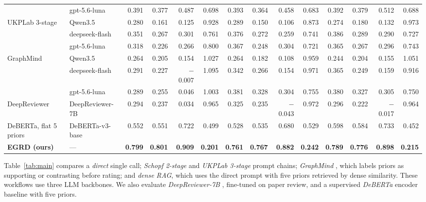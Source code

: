 \begin{table}[t]
{\begin{tabular}{@{}ll rrrr rrrr rrrr@{}}
& gpt-5.6-luna
& 0.391 & 0.377 & 0.487 & 0.698
& 0.393 & 0.364 & 0.458 & 0.683
& 0.392 & 0.379 & 0.512 & 0.688 \\
\addlinespace
UKPLab 3-stage & Qwen3.5
& 0.280 & 0.161 & 0.125 & 0.928
& 0.289 & 0.150 & 0.106 & 0.873
& 0.274 & 0.180 & 0.132 & 0.973 \\
& deepseek-flash
& 0.351 & 0.267 & 0.301 & 0.761
& 0.376 & 0.272 & 0.259 & 0.741
& 0.386 & 0.289 & 0.290 & 0.727 \\
& gpt-5.6-luna
& 0.318 & 0.226 & 0.266 & 0.800
& 0.367 & 0.248 & 0.304 & 0.721
& 0.365 & 0.267 & 0.296 & 0.743 \\
\addlinespace
GraphMind & Qwen3.5
& 0.264 & 0.205 & 0.154 & 1.027
& 0.264 & 0.182 & 0.108 & 0.959
& 0.244 & 0.204 & 0.155 & 1.051 \\
& deepseek-flash
& 0.291 & 0.227 & $-$0.007 & 1.095
& 0.342 & 0.266 & 0.154 & 0.971
& 0.365 & 0.249 & 0.159 & 0.916 \\
& gpt-5.6-luna
& 0.289 & 0.255 & 0.046 & 1.003
& 0.381 & 0.328 & 0.304 & 0.755
& 0.380 & 0.327 & 0.305 & 0.750 \\
\addlinespace
DeepReviewer & DeepReviewer-7B
& 0.294 & 0.237 & 0.034 & 0.965
& 0.325 & 0.235 & $-$0.043 & 0.972
& 0.296 & 0.222 & $-$0.017 & 0.964 \\
\addlinespace
DeBERTa, flat 5 priors & DeBERTa-v3-base
& 0.552 & 0.551 & 0.722 & 0.499
& 0.528 & 0.535 & 0.680 & 0.529
& 0.598 & 0.584 & 0.733 & 0.452 \\
\addlinespace
\textbf{EGRD (ours)} & ---
& \textbf{0.799} & \textbf{0.801} & \textbf{0.909} & \textbf{0.201}
& \textbf{0.761} & \textbf{0.767} & \textbf{0.882} & \textbf{0.242}
& \textbf{0.789} & \textbf{0.776} & \textbf{0.898} & \textbf{0.215} \\
\bottomrule
\end{tabular}}
\end{table}

Table~\ref{tab:main} compares a \emph{direct} single call;
\emph{Schopf 2-stage} \citep{schopf2026rinobench} and \emph{UKPLab 3-stage}
\citep{afzal2026beyond} prompt chains; \emph{GraphMind}
\citep{dasilva2025graphmind}, which labels priors as supporting or contrasting
before rating; and \emph{dense RAG}, which uses the direct prompt with five
priors retrieved by dense similarity. These workflows use three LLM backbones.
We also evaluate \emph{DeepReviewer-7B} \citep{zhu2025deepreview}, fine-tuned on
paper review, and a supervised \emph{DeBERTa} encoder baseline with five priors.

